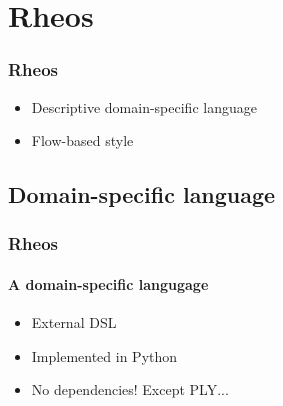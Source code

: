 \documentclass[10pt]{beamer}
\begin{document}
\section{Rheos}
\begin{frame}
\frametitle{Rheos}

\begin{itemize}
\pause
\item Descriptive domain-specific language
\pause
\item Flow-based style
\end{itemize}
\end{frame}


\subsection*{Domain-specific language}
\begin{frame}
\frametitle{Rheos}
\framesubtitle{A domain-specific langugage}

\begin{itemize}
\pause
\item External DSL
\pause
\item Implemented in Python
\pause
\item No dependencies! Except PLY...
\end{itemize}

\end{frame}




\end{document}

